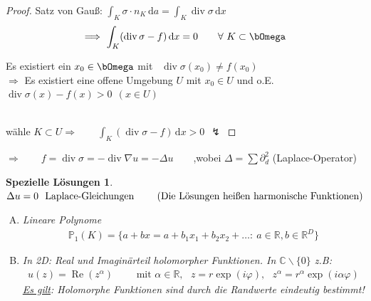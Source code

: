 \documentclass[12pt,twoside,reqno]{article}
\newcommand{\dx}{\,\mathrm{d}x}
\newcommand{\da}{\,\mathrm{d}a}
\renewcommand\div{\operatorname{div}}
\renewcommand\Re{\operatorname*{Re}}
\renewcommand{\Omega}{\bOmega}
\newcommand{\R}{\mathbb{R}}
\newcommand{\C}{\mathbb{C}}
\renewcommand{\P}{\mathbb{P}}
\theoremstyle{TheoWieners}
\theoremstyle{break}
\theoremstyle{app}
\newtheorem{Spezielle Lösungen}[app]{Spezielle Lösungen}
\newtheorem{Spezielle Lösungen der Poisson-Gleichung}[app]{Spezielle Lösungen der Poisson-Gleichung}
\newtheorem{Kartesische Gitter in 2-d}[app]{Kartesische Gitter in 2-d}
\newtheorem{Diskretisierungen hoher Ordnung}[app]{Diskretisierungen hoher Ordnung}
\newtheorem{Zyklische Reduktion}[app]{Zyklische Reduktion}
\begin{document}
\begin{proof}
   Satz von Gau\ss : $\int_{K} \sigma \cdot n_{K} \da = \int_{K} \div \sigma \dx$
    \begin{eqnarray*}
        \Longrightarrow \ \int_{K} (\div \sigma-f) \dx = 0 \qquad \forall \ K\subset \Omega
    \end{eqnarray*}
   \begin{ann}
   Es existiert ein $x_0 \in \Omega$ mit \ $\div \sigma (x_0) \neq f(x_0)$\\ $\Rightarrow$ Es existiert eine offene Umgebung $U$ mit $x_0 \in U$ und o.E. \ $\div \sigma (x) - f(x) > 0 \ \ (x\in U)$
\end{ann}\\ \newline
wähle $K \subset U \Longrightarrow \qquad \int_{K} (\div \sigma-f) \dx > 0 \ \ \lightning$
\end{proof}


$\Longrightarrow \qquad f = \div \sigma = - \div \nabla u = - \Delta u \qquad$,wobei $\Delta = \sum \partial^2_d$ (Laplace-Operator)

\begin{Spezielle Lösungen}\
\\ $ \Delta u = 0 \ \text{ Laplace-Gleichungen \qquad (Die Lösungen hei\ss en harmonische Funktionen)} $
\begin{enumerate}[A)]
    \item 	
	Lineare Polynome
	\begin{eqnarray*}
           \P_1(K)= \big\{ a+bx = a+b_1 x_1 + b_2 x_2 + \ldots : \ a \in \R, b\in \R^D \big\}
	\end{eqnarray*}
	     \item
	In 2D: Real und Imaginärteil holomorpher Funktionen. In $\C \backslash \{ 0 \} $ z.B:
	\begin{eqnarray*}
            u(z) =\Re (z^\alpha) \qquad \text{ mit } \alpha \in \R, \ \ \ z=r \exp (i \varphi),\ \ \ z^\alpha=r^\alpha \exp (i \alpha \varphi)
	\end{eqnarray*}
    \underline{Es gilt}: Holomorphe Funktionen sind durch die Randwerte eindeutig bestimmt! 
    	\end{enumerate}

\end{Spezielle Lösungen}
\end{document}
